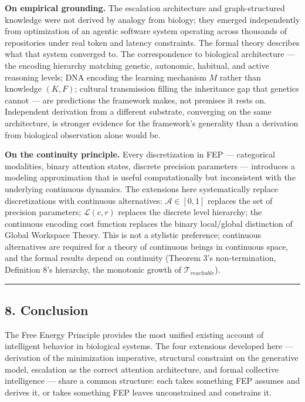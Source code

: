 \documentclass[
]{article}
\begin{document}
\textbf{On empirical grounding.} The escalation architecture and
graph-structured knowledge were not derived by analogy from biology;
they emerged independently from optimization of an agentic software
system operating across thousands of repositories under real token and
latency constraints. The formal theory describes what that system
converged to. The correspondence to biological architecture --- the
encoding hierarchy matching genetic, autonomic, habitual, and active
reasoning levels; DNA encoding the learning mechanism \(M\) rather than
knowledge \((K, F)\); cultural transmission filling the inheritance gap
that genetics cannot --- are predictions the framework makes, not
premises it rests on. Independent derivation from a different substrate,
converging on the same architecture, is stronger evidence for the
framework's generality than a derivation from biological observation
alone would be.

\textbf{On the continuity principle.} Every discretization in FEP ---
categorical modalities, binary attention states, discrete precision
parameters --- introduces a modeling approximation that is useful
computationally but inconsistent with the underlying continuous
dynamics. The extensions here systematically replace discretizations
with continuous alternatives: \(\mathcal{A} \in [0,1]\) replaces the set
of precision parameters; \(\mathcal{L}(c, r)\) replaces the discrete
level hierarchy; the continuous encoding cost function replaces the
binary local/global distinction of Global Workspace Theory. This is not
a stylistic preference; continuous alternatives are required for a
theory of continuous beings in continuous space, and the formal results
depend on continuity (Theorem 3's non-termination, Definition 8's
hierarchy, the monotonic growth of \(\mathcal{T}_{reachable}\)).

\begin{center}\rule{0.5\linewidth}{0.5pt}\end{center}

\subsection{8. Conclusion}\label{conclusion}

The Free Energy Principle provides the most unified existing account of
intelligent behavior in biological systems. The four extensions
developed here --- derivation of the minimization imperative, structural
constraint on the generative model, escalation as the correct attention
architecture, and formal collective intelligence --- share a common
structure: each takes something FEP assumes and derives it, or takes
something FEP leaves unconstrained and constrains it.
\end{document}
